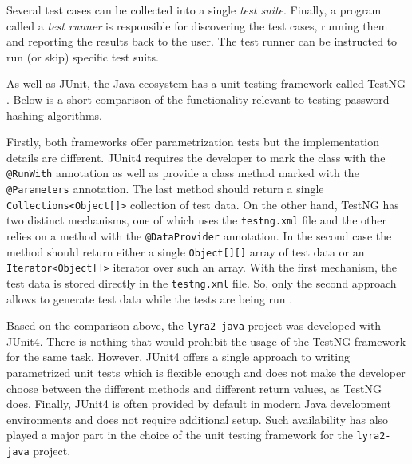 Several test cases can be collected into a single \emph{test suite}. Finally, a program called a \emph{test runner} is responsible for discovering the test cases, running them and reporting the results back to the user. The test runner can be instructed to run (or skip) specific test suits.

As well as JUnit, the Java ecosystem has a unit testing framework called TestNG \cite{testng:2017:home}. Below is a short comparison of the functionality relevant to testing password hashing algorithms.

Firstly, both frameworks offer parametrization tests but the implementation details are different. JUnit4 requires the developer to mark the class with the \texttt{@RunWith} annotation as well as provide a class method marked with the \texttt{@Parameters} annotation. The last method should return a single \texttt{Collections<Object[]>} collection of test data. On the other hand, TestNG has two distinct mechanisms, one of which uses the \texttt{testng.xml} file and the other relies on a method with the \texttt{@DataProvider} annotation. In the second case the method should return either a single \texttt{Object[][]} array of test data or an \texttt{Iterator<Object[]>} iterator over such an array. With the first mechanism, the test data is stored directly in the \texttt{testng.xml} file. So, only the second approach allows to generate test data while  the tests are being run \cite{testng:2017:parametrized-testing}.

Based on the comparison above, the \texttt{lyra2-java} project was developed with JUnit4. There is nothing that would prohibit the usage of the TestNG framework for the same task. However, JUnit4 offers a single approach to writing parametrized unit tests which is flexible enough and does not make the developer choose between the different methods and different return values, as TestNG does. Finally, JUnit4 is often provided by default in modern Java development environments and does not require additional setup. Such availability has also played a major part in the choice of the unit testing framework for the \texttt{lyra2-java} project.

